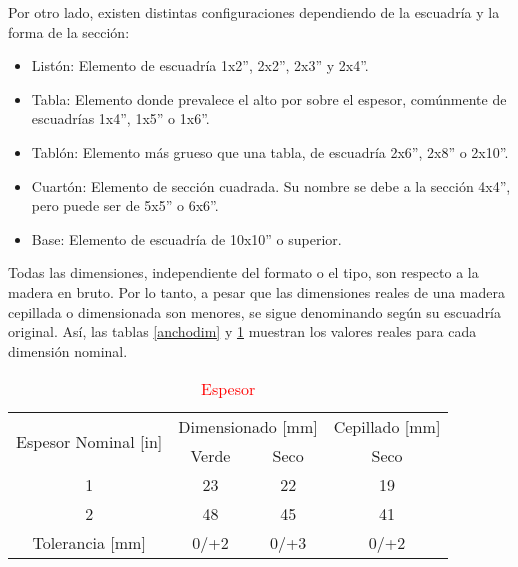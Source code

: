 Por otro lado, existen distintas configuraciones dependiendo de la escuadría y la forma de la sección:
\begin{itemize}
	\item Listón: Elemento de escuadría 1x2'', 2x2'', 2x3'' y 2x4''.
	\item Tabla: Elemento donde prevalece el alto por sobre el espesor, comúnmente de escuadrías 1x4'', 1x5'' o 1x6''.
	\item Tablón: Elemento más grueso que una tabla, de escuadría 2x6'', 2x8'' o 2x10''.
	\item Cuartón: Elemento de sección cuadrada. Su nombre se debe a la sección 4x4'', pero puede ser de 5x5'' o 6x6''.
	\item Base: Elemento de escuadría de 10x10'' o superior. 
\end{itemize}

Todas las dimensiones, independiente del formato o el tipo, son respecto a la madera en bruto. Por lo tanto, a pesar que las dimensiones reales de una madera cepillada o dimensionada son menores, se sigue denominando según su escuadría original. Así, las tablas \ref{anchodim} y \ref{espdim} muestran los valores reales para cada dimensión nominal.

\begin{table}[H]
\centering
\caption{\textcolor{red}{Espesor}}
\label{espdim}
\begin{tabular}{@{}cccc@{}}
\toprule
\multirow{2}{*}{Espesor Nominal {[}in{]}} & \multicolumn{2}{c}{Dimensionado {[}mm{]}} & Cepillado {[}mm{]} \\ \cmidrule(l){2-4} 
                                  & Verde                & Seco               & Seco               \\ \midrule
1                                 & 23                   & 22                 & 19                 \\
2                                 & 48                   & 45                 & 41                 \\ \midrule
Tolerancia {[}mm{]}               & 0/+2                 & 0/+3               & 0/+2               \\ \bottomrule
\end{tabular}
\end{table}

